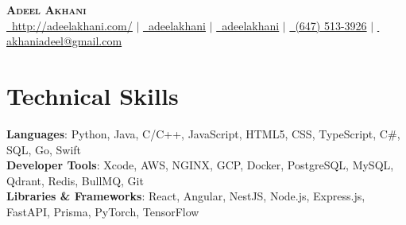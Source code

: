 \documentclass[letterpaper,11pt]{article}
\begin{document}
\begin{center}
    \textbf{\Huge \scshape Adeel Akhani} \\ \vspace{1pt}
    \small
    \href{http://adeelakhani.com/}{\faGlobe\, \underline{http://adeelakhani.com/}} $|$
    \href{https://www.linkedin.com/in/adeelakhani/}{\faLinkedin\, \underline{adeelakhani}} $|$ 
    \href{https://github.com/adeelakhani}{\faGithub\, \underline{adeelakhani}} $|$
    \href{tel:(647) 513-3926}{\faMobile*\, (647) 513-3926} $|$
    \href{mailto:akhaniadeel@gmail.com}{\faEnvelope\, \underline{akhaniadeel@gmail.com}}
\end{center}
\section{Technical Skills}
\begin{itemize}[leftmargin=0.15in, label={}]
    \small{\item{
    \textbf{Languages}{: Python, Java, C/C++, JavaScript, HTML5, CSS, TypeScript, C\#, SQL, Go, Swift} \\
    \textbf{Developer Tools}{: Xcode, AWS, NGINX, GCP, Docker, PostgreSQL, MySQL, Qdrant, Redis, BullMQ, Git} \\
    \textbf{Libraries \& Frameworks}{: React, Angular, NestJS, Node.js, Express.js, FastAPI, Prisma, PyTorch, TensorFlow}
    }}
\end{itemize}
\end{document}
